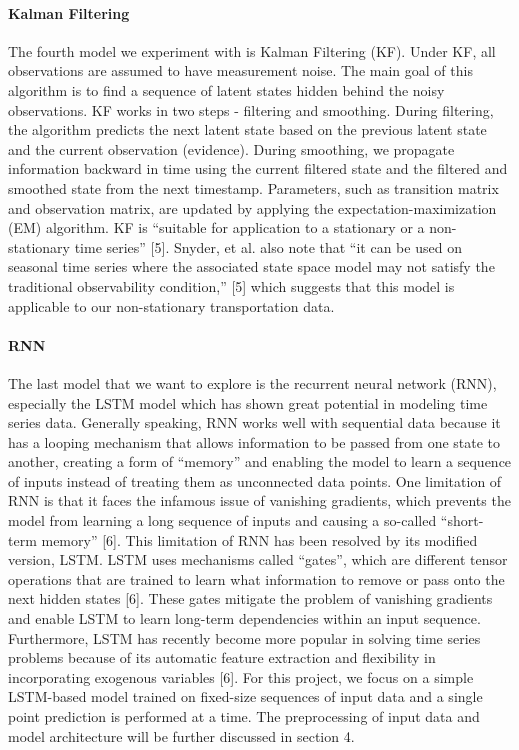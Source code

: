 \documentclass{article}
\begin{document}
\paragraph{Kalman Filtering}

The fourth model we experiment with is Kalman Filtering (KF). Under KF, all observations are assumed to have measurement noise. The main goal of this algorithm is to find a sequence of latent states hidden behind the noisy observations. KF works in two steps - filtering and smoothing. During filtering, the algorithm predicts the next latent state based on the previous latent state and the current observation (evidence). During smoothing, we propagate information backward in time using the current filtered state and the filtered and smoothed state from the next timestamp. Parameters, such as transition matrix and observation matrix, are updated by applying the expectation-maximization (EM) algorithm. KF is “suitable for application to a stationary or a non-stationary time series” [5]. Snyder, et al. also note that “it can be used on seasonal time series where the associated state space model may not satisfy the traditional observability condition,” [5] which suggests that this model is applicable to our non-stationary transportation data.

\paragraph{RNN}

The last model that we want to explore is the recurrent neural network (RNN), especially the LSTM model which has shown great potential in modeling time series data. Generally speaking, RNN works well with sequential data because it has a looping mechanism that allows information to be passed from one state to another, creating a form of “memory” and enabling the model to learn a sequence of inputs instead of treating them as unconnected data points. One limitation of RNN is that it faces the infamous issue of vanishing gradients, which prevents the model from learning a long sequence of inputs and causing a so-called “short-term memory” [6]. This limitation of RNN has been resolved by its modified version, LSTM. LSTM uses mechanisms called “gates”, which are different tensor operations that are trained to learn what information to remove or pass onto the next hidden states [6].  These gates mitigate the problem of vanishing gradients and enable LSTM to learn long-term dependencies within an input sequence. Furthermore, LSTM has recently become more popular in solving time series problems because of its automatic feature extraction and flexibility in incorporating exogenous variables [6]. For this project, we focus on a simple LSTM-based model trained on fixed-size sequences of input data and a single point prediction is performed at a time. The preprocessing of input data and model architecture will be further discussed in section 4.
\end{document}
